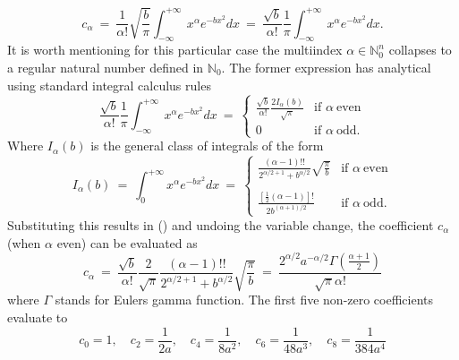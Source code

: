 \documentclass[11pt,a4paper]{article}
\begin{document}
 \begin{equation}
 c_{\alpha}\ =\ \frac{1}{\alpha !} \sqrt{\frac{b}{\pi}} \int_{-\infty}^{+\infty}\ x^{\alpha} e^{-b x^2} dx\ =\ \frac{\sqrt{b}}{\alpha !} \frac{1}{\pi} \int_{-\infty}^{+\infty}\ x^{\alpha} e^{-b x^2} dx.
 \end{equation}
It is worth mentioning for this particular case the multiindex $\alpha \in \mathbb{N}_0^n$ collapses to a regular natural number defined in $\mathbb{N}_0$.  The former expression has  analytical using standard integral calculus rules
\begin{equation}
\frac{\sqrt{b}}{\alpha !} \frac{1}{\pi} \int_{-\infty}^{+\infty}\ x^{\alpha} e^{-b x^2} dx\ =\
    \begin{cases}
        \frac{\sqrt{b}}{\alpha !} \frac{2 I_{\alpha}(b)}{\sqrt{\pi}} & \text{if } \alpha\ \text{even}\\
        0 & \text{if } \alpha\ \text{odd}.
    \end{cases}
\end{equation}
Where $I_{\alpha}(b)$ is the general class of integrals of the form
\begin{equation}
I_{\alpha}(b)\ =\ \int_{0}^{+\infty} x^{\alpha} e^{-b x^2} dx\ =\ 
\begin{cases}
        \frac{(\alpha - 1)!! }{2^{\alpha/2 + 1} + b^{\alpha/2}}   \sqrt{\frac{\pi}{b}} & \text{if } \alpha\ \text{even}\\
        &\\
        \frac{\left[\frac{1}{2}(\alpha - 1) \right]!}{2 b^{(\alpha + 1)/2}} & \text{if } \alpha\ \text{odd}.
    \end{cases}
\end{equation}
Substituting this results in () and undoing the variable change,  the coefficient $c_{\alpha}$ (when $\alpha$ even) can be evaluated as
\begin{equation}
c_{\alpha}\ =\  \frac{\sqrt{b}}{\alpha !} \frac{2}{\sqrt{\pi}}  \frac{(\alpha - 1)!! }{2^{\alpha/2 + 1} + b^{\alpha/2}}   \sqrt{\frac{\pi}{b}}\ =\ \frac{2^{\alpha/2} a^{-\alpha/2} \Gamma(\frac{\alpha + 1}{2})}{\sqrt{\pi} \alpha!}
\end{equation}
where $\Gamma$ stands for Euler\textquotesingle s gamma function.  The first five non-zero coefficients evaluate to
\begin{equation}
c_0 = 1,  \quad c_2 = \frac{1}{2a},  \quad c_4 = \frac{1}{8a^2},  \quad c_6 = \frac{1}{48a^3},\quad c_8 = \frac{1}{384a^4}
\end{equation}
 
\end{document}
